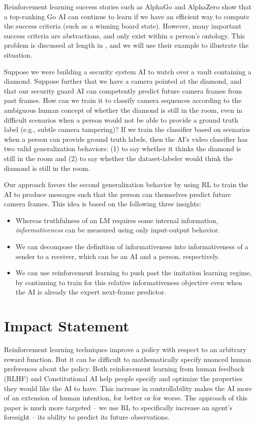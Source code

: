 \documentclass{article} %
\begin{document}
Reinforcement learning success stories such as AlphaGo \citep{Silver2016} and AlphaZero \citep{Silver2017} show that a top-ranking Go AI can continue to learn if we have an efficient way to compute the success criteria (such as a winning board state). However, many important success criteria are abstractions, and only exist within a person's ontology. This problem is discussed at length in \citet{christiano2021eliciting}, and we will use their example to illustrate the situation. 

Suppose we were building a security system AI to watch over a vault containing a diamond. Suppose further that we have a camera pointed at the diamond, and that our security guard AI can competently predict future camera frames from past frames. How can we train it to classify camera sequences according to the ambiguous human concept of whether the diamond is still in the room, even in difficult scenarios when a person would not be able to provide a ground truth label (e.g., subtle camera tampering)? If we train the classifier based on scenarios when a person can provide ground truth labels, then the AI's video classifier has two valid generalization behaviors: (1) to say whether it thinks the diamond is still in the room and (2) to say whether the dataset-labeler would think the diamond is still in the room. 

Our approach favors the second generalization behavior by using RL to train the AI to produce messages such that the person can themselves predict future camera frames.
This idea is based on the following three insights:
\begin{itemize}
\item Whereas truthfulness of an LM requires some internal information, \emph{informativeness} can be measured using only input-output behavior.
\item We can decompose the definition of informativeness into informativeness of a sender to a receiver, which can be an AI and a person, respectively.
\item We can use reinforcement learning to push past the imitation learning regime, by continuing to train for this relative informativeness objective even when the AI is already the expert next-frame predictor.
\end{itemize}



\section{Impact Statement}
\label{sec:ethics}
Reinforcement learning techniques improve a policy with respect to an arbitrary reward function. But it can be difficult to mathematically specify nuanced human preferences about the policy. Both reinforcement learning from human feedback (RLHF) \citep{christiano2023deepreinforcementlearninghuman} and Constitutional AI \citep{bai2022constitutional} help people specify and optimize the properties they would like the AI to have. This increase in controllability makes the AI more of an extension of human intention, for better or for worse. The approach of this paper is much more targeted -- we use RL to specifically increase an agent's foresight -- its ability to predict its future observations. 
\end{document}
